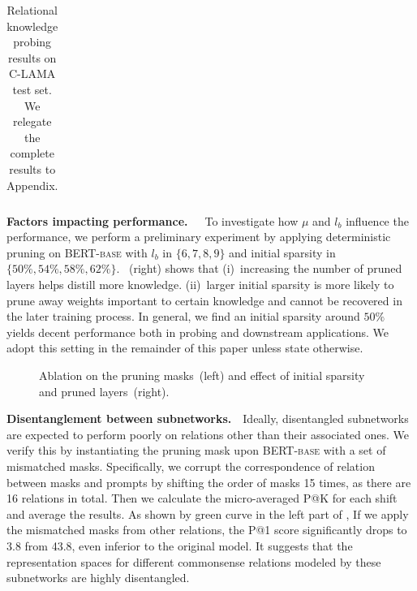 \begin{table}[t!]
\begin{tabular}{l|ccc|c|c|c}
		\bottomrule
	\end{tabular}
	\caption{Relational knowledge probing results on C-LAMA test set. We relegate the 
		complete results to Appendix.}
	\label{table:rank}
\end{table}

\noindent
\textbf{Factors impacting performance.}~~~To investigate how $\mu$ and $l_b$ influence the  performance, we perform a preliminary experiment by applying deterministic pruning on \textsc{BERT-base} with $l_b$ in $\{6,7,8,9\}$ and initial sparsity in $\{50\%,54\%,58\%,62\%\}$.  ~(right) shows that (i)~increasing the number of pruned layers helps distill more knowledge. (ii)~larger initial sparsity is more likely to prune away weights important to certain knowledge and cannot be recovered in the later training process. In general, we find an initial sparsity around $50\%$ yields decent performance both in probing and downstream applications. We adopt this setting in the remainder of this paper unless state otherwise.

\begin{figure}[t]
	\centering
	\caption{Ablation on the pruning masks~(left) and effect of initial sparsity and pruned layers~(right).} \label{fig:both}
\end{figure}

\noindent
\textbf{Disentanglement between subnetworks.}~~Ideally, disentangled subnetworks are expected to perform poorly on relations other than their associated ones. We verify this by instantiating the pruning mask upon \textsc{BERT-base} with a set of mismatched masks.
Specifically, we corrupt the correspondence of relation between masks and prompts by shifting the order of masks 15 times, as there are 16 relations in total. Then we calculate the micro-averaged P@K for each shift and average the results. As shown by green curve in the left part of , If we apply the mismatched masks from other relations, the P@1  score significantly drops to $3.8$ from 43.8, even inferior to the original model. It suggests that the representation spaces for different commonsense relations modeled by these subnetworks are highly disentangled.

